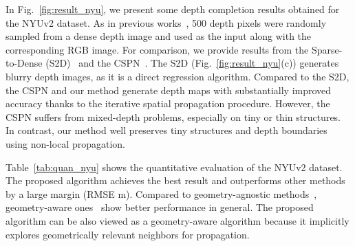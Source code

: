 \documentclass[runningheads]{llncs}
\newcommand{\figref}[1]{Fig.~\ref{#1}}
\newcommand{\Tabref}[1]{Table~\ref{#1}}
\begin{document}
In \figref{fig:result_nyu}, we present some depth completion results obtained for the NYUv2 dataset. 
As in previous works~\cite{ma2018sparse,cheng2018depth}, 500 depth pixels were randomly sampled from a dense depth image and used as the input along with the corresponding RGB image. 
For comparison, we provide results from the Sparse-to-Dense (S2D)~\cite{ma2018sparse} and the CSPN~\cite{cheng2018depth}. 
The S2D (\figref{fig:result_nyu}(c)) generates blurry depth images, as it is a direct regression algorithm. 
Compared to the S2D, the CSPN and our method generate depth maps with substantially improved accuracy thanks to the iterative spatial propagation procedure. 
However, the CSPN suffers from mixed-depth problems, especially on tiny or thin structures. 
In contrast, our method well preserves tiny structures and depth boundaries using non-local propagation.


\Tabref{tab:quan_nyu} shows the quantitative evaluation of the NYUv2 dataset. 
The proposed algorithm achieves the best result and outperforms other methods by a large margin (RMSE m).
Compared to geometry-agnostic methods~\cite{ma2018sparse,liu2017learning,cheng2018depth}, geometry-aware ones~\cite{imran2019depth,cheng2019cspnpp,qiu2019deeplidar,xu2019depth} show better performance in general. 
The proposed algorithm can be also viewed as a geometry-aware algorithm because it implicitly explores geometrically relevant neighbors for propagation.
\end{document}
